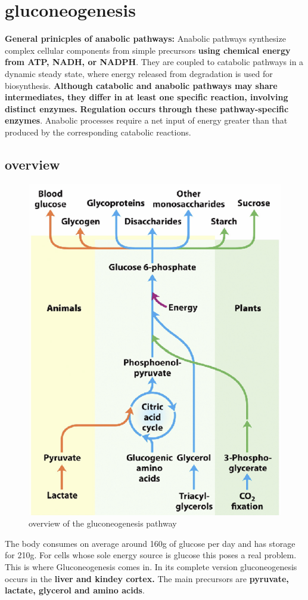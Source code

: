\documentclass[../main.tex]{subfiles}
\begin{document}
\section{gluconeogenesis}

\begin{remark}
    \textbf{General prinicples of anabolic pathways:} Anabolic pathways synthesize complex cellular components from simple precursors \textbf{using chemical energy from ATP, NADH, or NADPH}. They are coupled to catabolic pathways in a dynamic steady state, where energy released from degradation is used for biosynthesis. \textbf{Although catabolic and anabolic pathways may share intermediates, they differ in at least one specific reaction, involving distinct enzymes.} \textbf{Regulation occurs through these pathway-specific enzymes}. Anabolic processes require a net input of energy greater than that produced by the corresponding catabolic reactions.
\end{remark}
\subsection{overview}
\begin{figure}[H]
    \centering
    \includegraphics[width=0.5\linewidth]{overview.png}
    \caption{overview of the gluconeogenesis pathway}
    \label{fig:enter-label}
\end{figure}
The body consumes on average around 160g of glucose per day and has storage for 210g. For cells whose sole energy source is glucose this poses a real problem. This is where Gluconeogenesis comes in. In its complete version gluconeogenesis occurs in the \textbf{ liver and kindey cortex.} The main precursors are \textbf{pyruvate, lactate, glycerol and amino acids}. 
\end{document}
